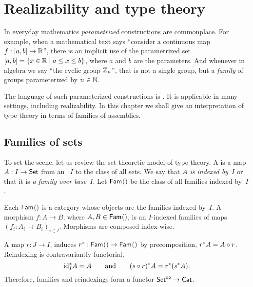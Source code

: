 \chapter{Realizability and type theory}
\label{cha:type-theory-real}

In everyday mathematics \emph{parametrized} constructions are commonplace. For
example, when a mathematical text says ``consider a continuous map $f
: [a,b] \to \RR$'', there is an
implicit use of the parametrized set $[a,b] = \set{x \in \RR \such a
  \leq x \leq b}$, where $a$ and $b$ are the parameters. 
And whenever in algebra we say ``the cyclic group $\ZZ_n$'', that is not a single group, but a \emph{family} of groups parameterized by $n \in \NN$.

The language of such parameterized constructions is . It is applicable in many settings, including realizability. In this chapter we shall give an interpretation of type theory in terms of families of assemblies.


\section{Families of sets}
\label{sec:families-sets}

To set the scene, let us review the set-theoretic model of type theory. A  is a map $A : I \to \Set$ from an ~$I$ to the class of all sets. We say that \emph{$A$ is indexed by~$I$} or that it is \emph{a family over base~$I$}. Let $\Fam{I}$ be the class of all families indexed by~$I$.

Each $\Fam{I}$ is a category whose objects are the families indexed by~$I$. A morphism $f : A \to B$, where $A, B \in \Fam{I}$, is an $I$-indexed families of maps $(f_i : A_i \to B_i)_{i \in I}$. Morphisms are composed index-wise.

A map $r : J \to I$, induces  $\invim{r} : \Fam{I} \to \Fam{J}$ by precomposition, $\invim{r} A = A \circ r$. Reindexing is contravariantly functorial,
%
\begin{equation*}
  \invim{\id[I]} A  = A
  \qquad\text{and}\qquad
  \invim{(s \circ r)} A = \invim{r} (\invim{s} A).
\end{equation*}
%
Therefore, families and reindexings form a functor $\opcat{\Set} \to \Cat$.

